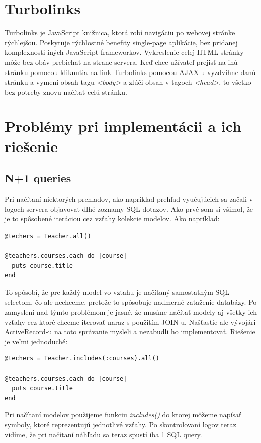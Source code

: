 \clearpage
\section{Turbolinks}

Turbolinks je JavaScript knižnica, ktorá robí navigáciu po webovej stránke rýchlejšou. Poskytuje rýchlostné benefity single-page aplikácie, bez pridanej komplexnosti iných JavaScript frameworkov. Vykreslenie celej HTML stránky môže bez obáv prebiehať na strane servera. Keď chce užívateľ prejisť na inú stránku pomocou kliknutia na link Turbolinks pomocou AJAX-u vyzdvihne danú stránku a vymení obsah tagu \emph{<body>} a zlúči obsah v tagoch \emph{<head>}, to všetko bez potreby znovu načítať celú stránku. \citep{web:turbolinks}

\section{Problémy pri implementácii a ich riešenie}
\subsection{N+1 queries}

Pri načítaní niektorých prehľadov, ako napríklad prehľad vyučujúcich sa začali v logoch servera objavovať dlhé zoznamy SQL dotazov. Ako prvé som si všimol, že je to spôsobené iteráciou cez vzťahy kolekcie modelov. Ako napríklad:

\begin{verbatim}
@techers = Teacher.all()

@teachers.courses.each do |course|
  puts course.title
end
\end{verbatim}

To spôsobí, že pre každý model vo vzťahu je načítaný samostatným SQL selectom, čo ale nechceme, pretože to spôsobuje nadmerné zaťaženie databázy. Po zamyslení nad týmto problémom je jasné, že musíme načítať modely aj všetky ich vzťahy cez ktoré chceme iterovať naraz s použitím JOIN-u.
Našťastie ale vývojári ActiveRecord-u na toto správanie mysleli a nezabudli ho implementovať. Riešenie je veľmi jednoduché:

\begin{verbatim}
@techers = Teacher.includes(:courses).all()

@teachers.courses.each do |course|
  puts course.title
end
\end{verbatim}

Pri načítaní modelov použijeme funkciu \emph{includes()} do ktorej môžeme napísať symboly, ktoré reprezentujú jednotlivé vzťahy. Po skontrolovaní logov teraz vidíme, že pri načítaní náhľadu sa teraz spustí iba 1 SQL query.

